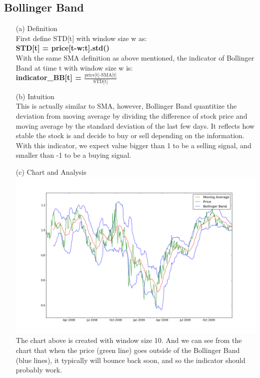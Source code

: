 \documentclass[a4paper]{article}
\begin{document}
\subsection{Bollinger Band}
\begin{itemize}
\item[(a)] Definition \\
		First define STD[t] with window size w as: \\
		\textbf{STD[t] = price[t-w:t].std()} \\
		With the same SMA definition as above mentioned, the indicator of Bollinger Band
		at time t with window size w is: \\
		\textbf{indicator\_BB[t] = $\frac{\text{price[t]-SMA[t]}}{\text{STD[t]}}$}
\item[(b)] Intuition \\
		This is actually similar to SMA, however, Bollinger Band quantitize the deviation
		from moving average by dividing the difference of stock price and moving average by
		the standard deviation of the last few days. It reflects how stable the stock is and
		decide to buy or sell depending on the information. With this indicator, we expect value
		bigger than 1 to be a selling signal, and smaller than -1 to be a buying signal.
\item[(c)] Chart and Analysis\\
	\includegraphics[width=\textwidth]{BB}
		The chart above is created with window size 10. And we can see from the chart that when the price (green line)
		goes outside of the Bollinger Band (blue lines), it typically will bounce back soon, and so the indicator should
		probably work.
\end{itemize}
\end{document}
